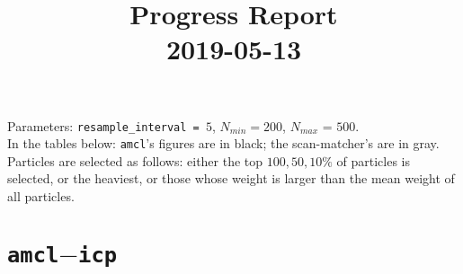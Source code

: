 \documentclass[a4paper,12pt]{article}
\title{Progress Report \\ 2019-05-13}
\begin{document}
\maketitle
\date{}


Parameters:
\texttt{resample\_interval = $5$}, $N_{min} = 200$, $N_{max}$ = $500$.\\
In the tables below: \texttt{amcl}'s figures are in black; the scan-matcher's
are in gray. Particles are selected as follows: either the top $100,50,10 \%$
of particles is selected, or the heaviest, or those whose weight is
larger than the mean weight of all particles.

\section{\texttt{amcl}$-$\texttt{icp}}
\end{document}
